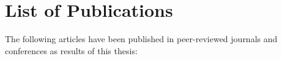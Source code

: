 \section{List of Publications} %
\label{sec:list_of_publications}
%
The following articles have been published in peer-reviewed journals and
conferences as results of this thesis:
%
%

